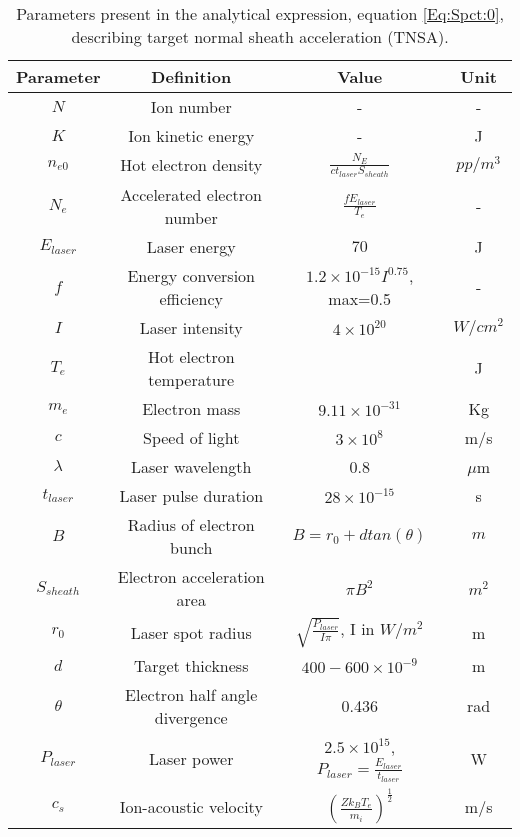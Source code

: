 \begin{table} 
  \caption{
    Parameters present in the analytical expression,
    equation \ref{Eq:Spct:0}, describing target normal sheath
    acceleration (TNSA).
  }
  \label{table:EnergySpectrumParameters}
  \begin{center}
    \begin{tabular}{c c c c}
      \hline
      \textbf{Parameter} & \textbf{Definition} & \textbf{Value} & \textbf{Unit} \\ [1ex] 
      \hline \hline
      $N$ & Ion number & - & - \\ 
      $K$ & Ion kinetic energy & - & J \\  
      $n_{e0}$ & Hot electron density & $\frac{N_{E}}{c t_{laser} S_{sheath}}$ & $pp/m^3$ \\ 
      $N_{e}$ & Accelerated electron number & $\frac{f E_{laser}}{T_e}$ & - \\ 
      $E_{laser}$ & Laser energy & $70$ & J \\  
      $f$ & Energy conversion efficiency & $1.2 \times 10^{-15} I^{0.75}$, max=0.5  & - \\   %
      $I$ & Laser intensity & $4 \times 10^{20}$ & $W/cm^{2}$ \\ 
      $T_{e}$ & Hot electron temperature &  & J \\ 
      $m_{e}$ & Electron mass & $9.11 \times 10^{-31}$ & Kg \\ 
      $c$ & Speed of light & $3 \times 10^{8}$ & m/s \\ 
      $\lambda$ & Laser wavelength & 0.8 & $\mu$m \\  
      $t_{laser}$ & Laser pulse duration & $28 \times 10^{-15}$  & s \\  
      $B$ & Radius of electron bunch & $B=r_{0} + d tan(\theta)$ & $m$ \\ 
      $S_{sheath}$ & Electron acceleration area & $\pi B^{2}$ & $m^{2}$ \\ 
      $r_{0}$ & Laser spot radius & $\sqrt{\frac{P_{laser}}{I \pi}}$, I in $W/m^{2}$ & m \\  
      $d$ & Target thickness & $400-600 \times 10^{-9}$ & m \\  
      $\theta$ & Electron half angle divergence & 0.436 & rad \\  
      $P_{laser}$ & Laser power & $2.5 \times 10^{15}$, $P_{laser}=\frac{E_{laser}}{t_{laser}}$ & W \\  
      $c_{s}$ & Ion-acoustic velocity & $(\frac{Z k_{B} T_{e}}{m_{i}})^{\frac{1}{2}}$ & m/s \\  

\end{tabular}
\end{center}
\end{table}
